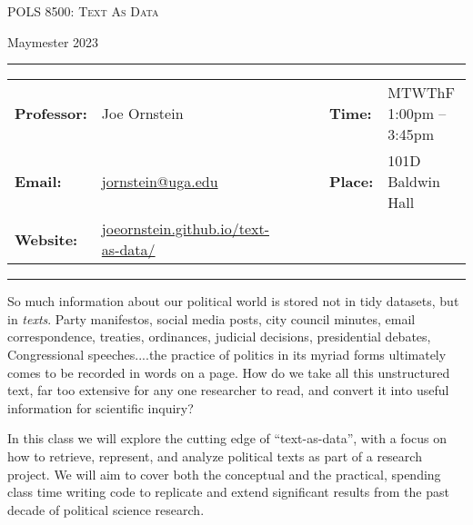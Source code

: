 \documentclass[11pt, letterpaper]{article}
\begin{document}
\begin{center}
{\Large \textsc{POLS 8500: Text As Data}}
\end{center}
\begin{center}
{\large Maymester 2023}
\end{center}

\begin{center}
\rule{6.5in}{0.4pt}
\begin{minipage}[t]{.96\textwidth}
\begin{tabular}{llcccll}
\textbf{Professor:} & Joe Ornstein & & &  & \textbf{Time:} & MTWThF 1:00pm -- 3:45pm \\
\textbf{Email:} &  \href{mailto:jornstein@uga.edu}{jornstein@uga.edu} & & & & \textbf{Place:} & 101D Baldwin Hall\\
\textbf{Website:} & \href{https://joeornstein.github.io/text-as-data/}{joeornstein.github.io/text-as-data/} & & & & &
\end{tabular}
\end{minipage}
\rule{6.5in}{0.4pt}
\end{center}
\vspace{.15cm}
\setlength{\unitlength}{1in}
\renewcommand{\arraystretch}{2}


\noindent So much information about our political world is stored not in tidy datasets, but in \textit{texts}. Party manifestos, social media posts, city council minutes, email correspondence, treaties, ordinances, judicial decisions, presidential debates, Congressional speeches....the practice of politics in its myriad forms ultimately comes to be recorded in words on a page. How do we take all this unstructured text, far too extensive for any one researcher to read, and convert it into useful information for scientific inquiry?

In this class we will explore the cutting edge of ``text-as-data'', with a focus on how to retrieve, represent, and analyze political texts as part of a research project. We will aim to cover both the conceptual and the practical, spending class time writing code to replicate and extend significant results from the past decade of political science research. 


\end{document}
